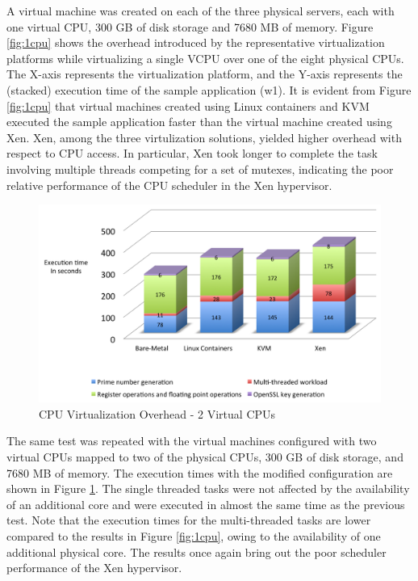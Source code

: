 A virtual machine was created on each of the three physical servers, each with one virtual CPU, 300 GB of disk storage and 7680 MB of memory. Figure \ref{fig:1cpu} shows the overhead introduced by the representative virtualization platforms while virtualizing a single VCPU over one of the eight physical CPUs. The X-axis represents the virtualization platform, and the Y-axis represents the (stacked) execution time of the sample application (w1). It is evident from Figure \ref{fig:1cpu} that virtual machines created using Linux containers and KVM executed the sample application faster than the virtual machine created using Xen. Xen, among the three virtulization solutions, yielded higher overhead with respect to CPU access. In particular, Xen took longer to complete the task involving multiple threads competing for a set of mutexes, indicating the poor relative performance of the CPU scheduler in the Xen hypervisor.


\begin{figure}[H]
\centering
\includegraphics[width=140mm]{2cpu.png}
\caption{CPU Virtualization Overhead - 2 Virtual CPUs}
\label{fig:2cpu}
\end{figure}

The same test was repeated with the virtual machines configured with two virtual CPUs mapped to two of the physical CPUs, 300 GB of disk storage, and 7680 MB of memory. The execution times with the modified configuration are shown in Figure \ref{fig:2cpu}. The single threaded tasks were not affected by the availability of an additional core and were executed in almost the same time as the previous test. Note that the execution times for the multi-threaded tasks are lower compared to the results in Figure \ref{fig:1cpu}, owing to the availability of one additional physical core. The results once again bring out the poor scheduler performance of the Xen hypervisor.

